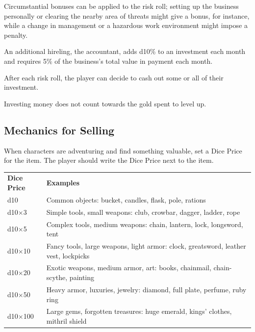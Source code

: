 \documentclass[twoside]{article}
\begin{document}
\bigbreak

Circumstantial bonuses can be applied to the risk roll; setting up the business personally or clearing the nearby area of threats might give a bonus, for instance, while a change in management or a hazardous work environment might impose a penalty.

\bigbreak

An additional hireling, the accountant, adds d10\% to an investment each month and requires 5\% of the business's total value in payment each month.

\bigbreak

After each risk roll, the player can decide to cash out some or all of their investment.

\bigbreak

Investing money does not count towards the gold spent to level up.

\subsection*{Mechanics for Selling}

When characters are adventuring and find something valuable, set a Dice Price for the item. The player should write the Dice Price next to the item.

\bigbreak

\begin{center}
\noindent\begin{tabular}{p{}p{}}
\textbf{Dice Price}&\textbf{Examples}\\
\rowcolor[gray]{0.75}d10&Common objects: bucket, candles, flask, pole, rations\\
d10$\times$3&Simple tools, small weapons: club, crowbar, dagger, ladder, rope\\
\rowcolor[gray]{0.75}d10$\times$5&Complex tools, medium weapons: chain, lantern, lock, longsword, tent\\
d10$\times$10&Fancy tools, large weapons, light armor: clock, greatsword, leather vest, lockpicks\\
\rowcolor[gray]{0.75}d10$\times$20&Exotic weapons, medium armor, art: books, chainmail, chain-scythe, painting\\
d10$\times$50&Heavy armor, luxuries, jewelry: diamond, full plate, perfume, ruby ring\\
\rowcolor[gray]{0.75}d10$\times$100&Large gems, forgotten treasures: huge emerald, kings' clothes, mithril shield\\
\end{tabular}
\end{center}
\end{document}
